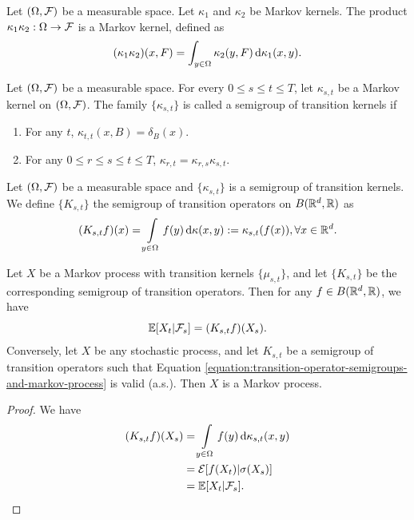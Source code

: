 \begin{definition}
  Let $(\Omega, \mathcal{F})$ be a measurable space. Let $\kappa_1$ and $\kappa_2$ be Markov kernels. The product $\kappa_1\kappa_2 : \Omega \to \mathcal{F}$ is a Markov kernel, defined as
  \begin{equation}
    (\kappa_1\kappa_2)(x,F) = \int_{y\in\Omega}\kappa_2(y,F)\,\mathrm{d}\kappa_1(x,y).
  \end{equation}
\end{definition}

\begin{definition}
  Let $(\Omega, \mathcal{F})$ be a measurable space. For every $0\le s\le t\le T$, let $\kappa_{s,t}$ be a Markov kernel on $(\Omega, \mathcal{F})$. The family $\{\kappa_{s,t}\}$ is called a semigroup of transition kernels if
  \begin{enumerate}[label=(\roman*), ref=(\roman*)]
    \item For any  $t$, $\kappa_{t,t}(x,B) = \delta_{B}(x)$.
    \item For any $0\le r\le s\le t\le T$, $\kappa_{r,t} = \kappa_{r,s}\kappa_{s,t}$.
  \end{enumerate}
\end{definition}

\begin{definition}
  Let $(\Omega, \mathcal{F})$ be a measurable space and $\{\kappa_{s,t}\}$ is a semigroup of transition kernels. We define $\{K_{s,t}\}$ the semigroup of transition operators on $B(\mathbb{R}^d,\mathbb{R})$ as
  \begin{equation}
    (K_{s,t}f)(x) = \int\limits_{y\in\Omega}f(y)\,\mathrm{d} \kappa(x,y) := \kappa_{s,t}(f(x)), \forall x\in\mathbb{R}^d.
  \end{equation}
\end{definition}

\begin{theorem}
  Let $X$ be a Markov process with transition kernels $\{\mu_{s,t}\}$, and let $\{K_{s,t}\}$ be the corresponding semigroup of transition operators. Then for any $f \in B(\mathbb{R}^d, \mathbb{R})$, we have
  \begin{equation}
    \label{equation:transition-operator-semigroups-and-markov-process}
    \mathbb{E}[X_t | \mathcal{F}_s] = (K_{s,t}f)(X_s).
  \end{equation}
  Conversely, let $X$ be any stochastic process, and let $K_{s,t}$ be a semigroup of transition operators such that Equation \ref{equation:transition-operator-semigroups-and-markov-process} is valid (a.s.). Then $X$ is a Markov process.
\end{theorem}
\begin{proof}
  We have
  \begin{align*}
    (K_{s,t}f)(X_s)
     & = \int\limits_{y\in\Omega}f(y)\,\mathrm{d} \kappa_{s,t}(x,y) \\
     & = \mathcal{E}[f(X_t) | \sigma(X_s)]                         \\
     & = \mathbb{E}[X_t | \mathcal{F}_s].
  \end{align*}
\end{proof}

